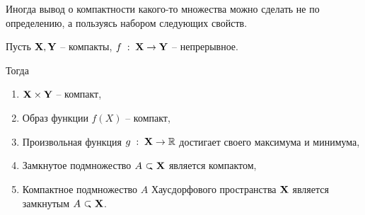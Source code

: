 Иногда вывод о компактности какого-то множества можно сделать не по определению, а пользуясь набором следующих свойств.
\begin{Lem}
    Пусть $\mathbf{X}, \mathbf{Y}$ -- компакты, $f\; : \; \mathbf{X} \to \mathbf{Y}$ -- непрерывное.

    Тогда
    \begin{enumerate}
        \item $\mathbf{X} \times \mathbf{Y}$ -- компакт,
        \item Образ функции $f(X)$ -- компакт,
        \item Произвольная функция  $g\; : \; \mathbf{X} \to \mathbb{R}$ достигает своего максимума и минимума,
        \item Замкнутое подмножество $A \closed \X$ является компактом,
        \item Компактное подмножество $A$ Хаусдорфового пространства $\mathbf{X}$ является замкнутым $A \closed \X$.
    \end{enumerate}
\end{Lem}
